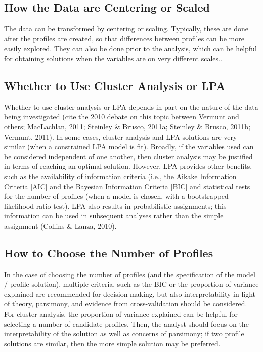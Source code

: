 \documentclass[man]{apa6}
\begin{document}
\subsection{How the Data are Centering or
Scaled}\label{how-the-data-are-centering-or-scaled}

The data can be transformed by centering or scaling. Typically, these
are done after the profiles are created, so that differences between
profiles can be more easily explored. They can also be done prior to the
analysis, which can be helpful for obtaining solutions when the
variables are on very different scales..

\subsection{Whether to Use Cluster Analysis or
LPA}\label{whether-to-use-cluster-analysis-or-lpa}

Whether to use cluster analysis or LPA depends in part on the nature of
the data being investigated (cite the 2010 debate on this topic between
Vermunt and others; MacLachlan, 2011; Steinley \& Brusco, 2011a;
Steinley \& Brusco, 2011b; Vermunt, 2011). In some cases, cluster
analysis and LPA solutions are very similar (when a constrained LPA
model is fit). Broadly, if the variables used can be considered
independent of one another, then cluster analysis may be justified in
terms of reaching an optimal solution. However, LPA provides other
benefits, such as the availability of information criteria (i.e., the
Aikake Information Criteria {[}AIC{]} and the Bayesian Information
Criteria {[}BIC{]} and statistical tests for the number of profiles
(when a model is chosen, with a bootstrapped likelihood-ratio test). LPA
also results in probabilistic assignments; this information can be used
in subsequent analyses rather than the simple assignment (Collins \&
Lanza, 2010).

\subsection{How to Choose the Number of
Profiles}\label{how-to-choose-the-number-of-profiles}

In the case of choosing the number of profiles (and the specification of
the model / profile solution), multiple criteria, such as the BIC or the
proportion of variance explained are recommended for decision-making,
but also interpretability in light of theory, parsimony, and evidence
from cross-validation should be considered. For cluster analysis, the
proportion of variance explained can be helpful for selecting a number
of candidate profiles. Then, the analyst should focus on the
interpretability of the solution as well as concerns of parsimony; if
two profile solutions are similar, then the more simple solution may be
preferred.
\end{document}
